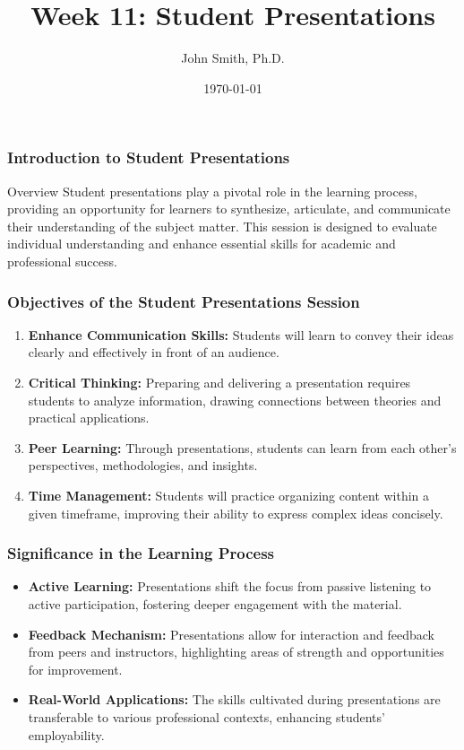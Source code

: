 \documentclass[aspectratio=169]{beamer}
\title[Week 11: Student Presentations]{Week 11: Student Presentations}
\author[J. Smith]{John Smith, Ph.D.}
\institute[University Name]{
  Department of Computer Science\\
  University Name\\
  \vspace{0.3cm}
  Email: email@university.edu\\
  Website: www.university.edu
}
\date{\today}
\begin{document}
\frame{\titlepage}

\begin{frame}[fragile]
    \frametitle{Introduction to Student Presentations}
    \begin{block}{Overview}
        Student presentations play a pivotal role in the learning process, providing an opportunity for learners to synthesize, articulate, and communicate their understanding of the subject matter. This session is designed to evaluate individual understanding and enhance essential skills for academic and professional success.
    \end{block}
\end{frame}

\begin{frame}[fragile]
    \frametitle{Objectives of the Student Presentations Session}
    \begin{enumerate}
        \item \textbf{Enhance Communication Skills:} Students will learn to convey their ideas clearly and effectively in front of an audience.
        \item \textbf{Critical Thinking:} Preparing and delivering a presentation requires students to analyze information, drawing connections between theories and practical applications.
        \item \textbf{Peer Learning:} Through presentations, students can learn from each other's perspectives, methodologies, and insights.
        \item \textbf{Time Management:} Students will practice organizing content within a given timeframe, improving their ability to express complex ideas concisely.
    \end{enumerate}
\end{frame}

\begin{frame}[fragile]
    \frametitle{Significance in the Learning Process}
    \begin{itemize}
        \item \textbf{Active Learning:} Presentations shift the focus from passive listening to active participation, fostering deeper engagement with the material.
        \item \textbf{Feedback Mechanism:} Presentations allow for interaction and feedback from peers and instructors, highlighting areas of strength and opportunities for improvement.
        \item \textbf{Real-World Applications:} The skills cultivated during presentations are transferable to various professional contexts, enhancing students’ employability.
    \end{itemize}
\end{frame}
\end{document}
